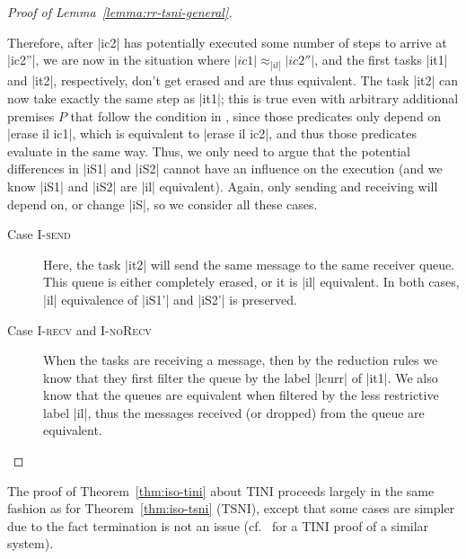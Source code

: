 \begin{proof}[Proof of Lemma~\ref{lemma:rr-tsni-general}]
\begin{itemize}
    
    Therefore, after |ic2| has potentially executed some number of steps
    to arrive at |ic2''|, we are now in the situation where $|ic1|\approx_{|il|}|ic2''|$, and the first tasks |it1| and |it2|,
    respectively, don't get erased and are thus equivalent.
    The task |it2| can now take exactly the same step as |it1|;  this
    is true even with arbitrary additional premises $P$ that follow
    the condition in , since those
    predicates only depend on |erase il ic1|, which is equivalent
    to |erase il ic2|, and thus those predicates evaluate in the same way.
    Thus, we only
    need to argue that the potential differences in |iS1| and |iS2| cannot
    have an influence on the execution (and we know |iS1| and |iS2| are
    |il| equivalent).
    Again, only sending and receiving will depend on, or change |iS|,
    so we consider all these cases.
    \begin{description}
      \item[Case \textsc{I-send}]
      Here, the task |it2| will send the same message to the same
      receiver queue. This
      queue is either completely erased, or it is |il| equivalent.  In both
      cases, |il| equivalence of |iS1'| and |iS2'| is preserved.
      \item[Case \textsc{I-recv} and \textsc{I-noRecv}]
      When the tasks are receiving a message, then by the reduction rules
      we know that they first filter the queue by the label
      |lcurr| of |it1|.  We
      also know that the queues are equivalent when filtered by the less
      restrictive label |il|, thus the messages received (or dropped) from the
      queue are equivalent.
    \end{description}
  \end{itemize}
\end{proof}


The proof of Theorem~\ref{thm:iso-tini} about TINI proceeds largely
in the same fashion as for Theorem~\ref{thm:iso-tsni} (TSNI), except that
some cases are simpler due to the fact termination is not an issue
(cf.~\tocite{} for a TINI proof of a similar system).

